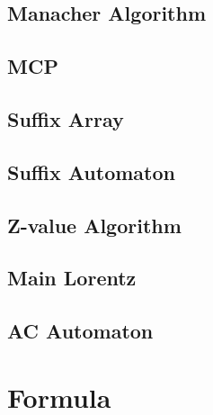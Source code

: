 \documentclass{article}
\newcommand{\makegrid}{
\clearpage

\begin{center}
    \begin{tikzpicture}
        \draw[step=1, gray, thin] (0,0) grid (20.0, 25.0);
    \end{tikzpicture}
\end{center}
}
\begin{document}
\subsection{Manacher Algorithm}


\subsection{MCP}


\subsection{Suffix Array}


\subsection{Suffix Automaton}


\subsection{Z-value Algorithm}


\subsection{Main Lorentz}


\subsection{AC Automaton}


\section{Formula}



\end{document}
